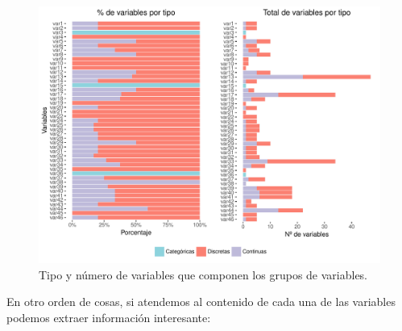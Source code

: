 \documentclass[11pt,a4paper,spanish]{article} %
\begin{document}
\begin{figure}[h!]
	\begin{center}
	\includegraphics[width=\textwidth]{Z_01_05_Grafico_tipo_variables.pdf}
    \caption{Tipo y número de variables que componen los grupos de variables.}
    \end{center}
\end{figure}


En otro orden de cosas, si atendemos al contenido de cada una de las variables podemos extraer información interesante:
\end{document}
